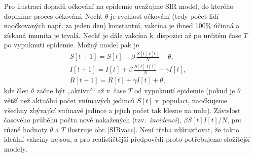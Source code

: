 Pro ilustraci dopadů očkování na epidemie uvažujme SIR model, do kterého doplníme proces očkování. Nechť $\theta$ je rychlost očkování (tedy počet lidí naočkovaných např. za jeden den) konstantní, vakcína je ihned 100\% účinná a získaná imunita je trvalá. Nechť je dále vakcína k~dispozici až po určitém čase $T$ po vypuknutí epidemie. Možný model pak je
\begin{equation}
\begin{array}{l}
\displaystyle{S[t+1] = S[t] - \beta \, \frac{S[t]\,I[t]}{N} - \theta}, \\[3ex]
\displaystyle{I[t+1] = I[t] + \beta \, \frac{S[t]\,I[t]}{N} - \gamma I[t]}, \\[3ex]
\displaystyle{R[t+1] = R[t] + \gamma I[t] + \theta},
\end{array}
\label{modSIRV}
\end{equation}
kde člen $\theta$ začne být „aktivní“ až v~čase $T$ od vypuknutí epidemie (pokud je $\theta$ větší než aktuální počet vnímavých jedinců $S[t]$ v~populaci, naočkujeme všechny zbývající vnímavé jedince a jejich počet tak klesne na nulu). Závislost časového průběhu počtu nově nakažených (tzv.\ \emph{incidenci}), $\beta S[t] I[t]/N$, pro různé hodnoty $\theta$ a $T$ ilustruje obr.\,\ref{SIRvacc}. Není třeba zdůrazňovat, že takto ideální vakcíny nejsou, a pro realističtější předpovědi proto potřebujeme složitější modely.

